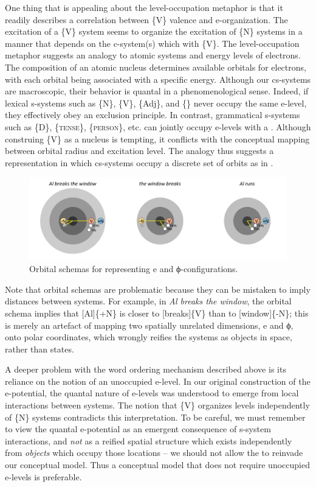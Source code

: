   One thing that is appealing about the level-occupation metaphor is that it readily describes a correlation between \{V\} valence and e-organization. The excitation of a \{V\} system seems to organize the excitation of \{N\} systems in a manner that depends on the c-system(s) which  with \{V\}. The level-occupation metaphor suggests an analogy to atomic systems and energy levels of electrons. The composition of an atomic nucleus determines available orbitals for electrons, with each orbital being associated with a specific energy. Although our cs-systems are macroscopic, their behavior is quantal in a phenomenological sense. Indeed, if lexical s-systems such as \{N\}, \{V\}, \{Adj\}, and \{\} never occupy the same e-level, they effectively obey an exclusion principle. In contrast, grammatical s-systems such as \{D\}, \{\textsc{tense}\}, \{\textsc{person}\}, etc. can jointly occupy e-levels with a . Although construing \{V\} as a nucleus is tempting, it conflicts with the conceptual mapping between orbital radius and excitation level. The analogy thus suggests a representation in which cs-systems occupy a discrete set of orbits as in {}.

  
\begin{figure}
\includegraphics[width=\textwidth]{figures/Tilsen-img76.png}
\caption{Orbital schemas for representing e and ϕ-configurations.}
\label{fig:4:26}
\end{figure}
 

  Note that orbital schemas are problematic because they can be mistaken to imply distances between systems. For example, in \textit{Al breaks the window}, the orbital schema implies that [Al]\{+N\} is closer to [breaks]\{V\} than to [window]\{-N\}; this is merely an artefact of mapping two spatially unrelated dimensions, e and ϕ, onto polar coordinates, which wrongly reifies the systems as objects in space, rather than states.

  A deeper problem with the word ordering mechanism described above is its reliance on the notion of an unoccupied e-level. In our original construction of the e-potential, the quantal nature of e-levels was understood to emerge from local interactions between systems. The notion that \{V\} organizes levels independently of \{N\} systems contradicts this interpretation. To be careful, we must remember to view the quantal e-potential as an emergent consequence of s-system interactions, and \textit{not} as a reified spatial structure which exists independently from \textit{objects} which occupy those locations -- we should not allow the  to reinvade our conceptual model. Thus a conceptual model that does not require unoccupied e-levels is preferable.

